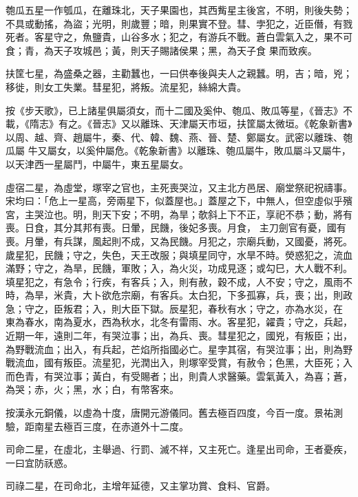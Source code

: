 \begin{pinyinscope}
 匏瓜五星一作瓠瓜，在離珠北，天子果園也，其西觜星主後宮，不明，則後失勢；不具或動搖，為盜；光明，則歲豐；暗，則果實不登。彗、孛犯之，近臣僭，有戮死者。客星守之，魚鹽貴，山谷多水；犯之，有游兵不戰。蒼白雲氣入之，果不可食；青，為天子攻城邑；黃，則天子賜諸侯果；黑，為天子食
 果而致疾。



 扶筐七星，為盛桑之器，主勸蠶也，一曰供奉後與夫人之親蠶。明，吉；暗，兇；移徙，則女工失業。彗星犯，將叛。流星犯，絲綿大貴。



 按《步天歌》，已上諸星俱屬須女，而十二國及奚仲、匏瓜、敗瓜等星，《晉志》不載，《隋志》有之。《晉志》又以離珠、天津屬天市垣，扶筐屬太微垣。《乾象新書》以周、越、齊、趙屬牛，秦、代、韓、魏、燕、晉、楚、鄭屬女。武密以離珠、匏瓜屬
 牛又屬女，以奚仲屬危。《乾象新書》以離珠、匏瓜屬牛，敗瓜屬斗又屬牛，以天津西一星屬鬥，中屬牛，東五星屬女。



 虛宿二星，為虛堂，塚宰之官也，主死喪哭泣，又主北方邑居、廟堂祭祀祝禱事。宋均曰：「危上一星高，旁兩星下，似蓋屋也。」蓋屋之下，中無人，但空虛似乎殯宮，主哭泣也。明，則天下安；不明，為旱；欹斜上下不正，享祀不恭；動，將有喪。日食，其分其邦有喪。日暈，民饑，後妃多喪。月食，
 主刀劍官有憂，國有喪。月暈，有兵謀，風起則不成，又為民饑。月犯之，宗廟兵動，又國憂，將死。歲星犯，民饑；守之，失色，天王改服；與填星同守，水旱不時。熒惑犯之，流血滿野；守之，為旱，民饑，軍敗；入，為火災，功成見逐；或勾巳，大人戰不利。填星犯之，有急令；行疾，有客兵；入，則有赦，穀不成，人不安；守之，風雨不時，為旱，米貴，大卜欲危宗廟，有客兵。太白犯，下多孤寡，兵，喪；出，則政急；守之，臣叛君；入，則大臣下獄。辰星犯，春秋有水；守之，亦為水災，在
 東為春水，南為夏水，西為秋水，北冬有雷雨、水。客星犯，糴貴；守之，兵起，近期一年，遠則二年，有哭泣事；出，為兵、喪。彗星犯之，國兇，有叛臣；出，為野戰流血；出入，有兵起，芒焰所指國必亡。星孛其宿，有哭泣事；出，則為野戰流血，國有叛臣。流星犯，光潤出入，則塚宰受賞，有赦令；色黑，大臣死；入而色青，有哭泣事；黃白，有受賜者；出，則貴人求醫藥。雲氣黃入，為喜；蒼，為哭；赤，火；黑，水；白，有幣客來。



 按漢永元銅儀，以虛為十度，唐開元游儀同。舊去極百四度，今百一度。景祐測驗，距南星去極百三度，在赤道外十二度。



 司命二星，在虛北，主舉過、行罰、滅不祥，又主死亡。逢星出司命，王者憂疾，一曰宜防祅惑。



 司祿二星，在司命北，主增年延德，又主掌功賞、食料、官爵。




\end{pinyinscope}
